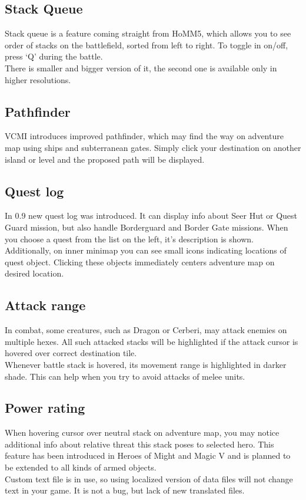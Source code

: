 \documentclass[a4size,final]{article}
\begin{document}
\subsection{Stack Queue}
Stack queue is a feature coming straight from HoMM5, which allows you to see order of stacks on the battlefield, sorted from left to right. To toggle in on/off, press `Q' during the battle.\\
There is smaller and bigger version of it, the second one is available only in higher resolutions.
\subsection{Pathfinder}
VCMI introduces improved pathfinder, which may find the way on adventure map using ships and subterranean gates. Simply click your destination on another island or level and the proposed path will be displayed.
\label{Quest_Log}
\subsection{Quest log}
In 0.9 new quest log was introduced. It can display info about Seer Hut or Quest Guard mission, but also handle Borderguard and Border Gate missions. When you choose a quest from the list on the left, it's description is shown. Additionally, on inner minimap you can see small icons indicating locations of quest object. Clicking these objects immediately centers adventure map on desired location.
\subsection{Attack range}
In combat, some creatures, such as Dragon or Cerberi, may attack enemies on multiple hexes. All such attacked stacks will be highlighted if the attack cursor is hovered over correct destination tile.\\
Whenever battle stack is hovered, its movement range is highlighted in darker shade. This can help when you try to avoid attacks of melee units.
\subsection{Power rating}
When hovering cursor over neutral stack on adventure map, you may notice additional info about relative threat this stack poses to selected hero. This feature has been introduced in Heroes of Might and Magic V and is planned to be extended to all kinds of armed objects.\\
Custom text file is in use, so using localized version of data files will not change text in your game. It is not a bug, but lack of new translated files.
\end{document}
